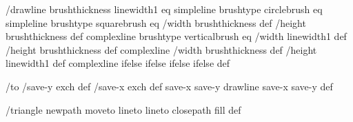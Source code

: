 /drawline
  { brushthickness linewidth1 eq
    { simpleline }
    { brushtype circlebrush eq
       { %
         simpleline }
       { brushtype squarebrush eq
          { %
            /width brushthickness def
	    /height brushthickness def
	    complexline }
          { brushtype verticalbrush eq
             { %
	       /width linewidth1 def
	       /height brushthickness def
	       complexline }
             { %
	       /width brushthickness def
	       /height linewidth1 def
	       complexline }
             ifelse }
          ifelse }
       ifelse }
    ifelse } def

/to
 { /save-y exch def
   /save-x exch def
   save-x save-y drawline
   save-x save-y } def

/triangle
 { newpath moveto lineto lineto closepath fill } def

